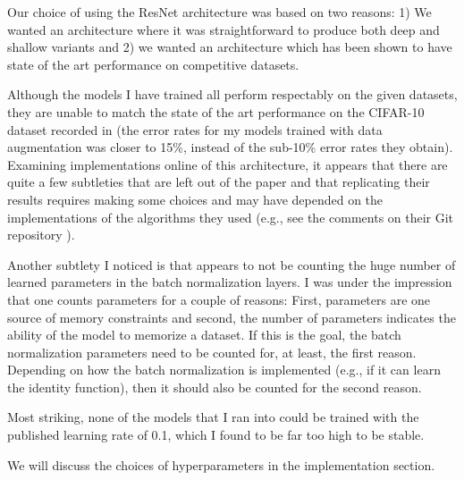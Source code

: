 \documentclass[english,a4paper,oneside]{amsart}
\theoremstyle{definition}
\begin{document}
Our choice of using the ResNet architecture was based on two  reasons: 1) We wanted an architecture where it was straightforward to produce both deep and shallow variants and 2) we wanted an architecture which has been shown to have state of the art performance on competitive datasets.

\begin{remark}\label{rem:CIFAR10}
	Although the models I have trained all perform respectably on the given datasets, they are unable to match the state of the art performance on the CIFAR-10 dataset recorded in \cite{ResNet} (the error rates for my models trained with data augmentation was closer to 15\%, instead of the sub-10\% error rates they obtain). Examining implementations online of this architecture, it appears that there are quite a few subtleties that are left out of the paper and that replicating their results requires making some choices and may have depended on the implementations of the algorithms they used (e.g., see the comments on their Git repository \cite{GitResnet}). 

	Another subtlety I noticed is that \cite{ResNet} appears to not be counting the huge number of learned parameters in the batch normalization layers. I was under the impression that one counts parameters for a couple of reasons: First, parameters are one source of memory constraints and second, the number of parameters indicates the ability of the model to memorize a dataset. If this is the goal, the batch normalization parameters need to be counted for, at least, the first reason. Depending on how the batch normalization is implemented (e.g., if it can learn the identity function), then it should also be counted for the second reason. 

	Most striking, none of the models that I ran into could be trained with the published learning rate of 0.1, which I found to be far too high to be stable. 
\end{remark}
We will discuss the choices of hyperparameters in the implementation section. 


\end{document}
